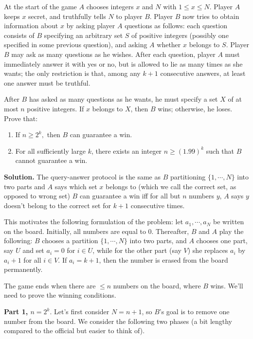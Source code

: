 \documentclass[11pt,a4paper]{article}
\begin{document}
\begin{enumerate}
		At the start of the game $A$ chooses integers $x$ and $N$ with $1 \le x \le N.$ Player $A$ keeps $x$ secret, and truthfully tells $N$ to player $B$. Player $B$ now tries to obtain information about $x$ by asking player $A$ questions as follows: each question consists of $B$ specifying an arbitrary set $S$ of positive integers (possibly one specified in some previous question), and asking $A$ whether $x$ belongs to $S$. Player $B$ may ask as many questions as he wishes. After each question, player $A$ must immediately answer it with yes or no, but is allowed to lie as many times as she wants; the only restriction is that, among any $k+1$ consecutive answers, at least one answer must be truthful.
		
		After $B$ has asked as many questions as he wants, he must specify a set $X$ of at most $n$ positive integers. If $x$ belongs to $X$, then $B$ wins; otherwise, he loses. Prove that:
		\begin{enumerate}
			\item 
			If $n \ge 2^k,$ then $B$ can guarantee a win.
			
			\item For all sufficiently large $k$, there exists an integer $n \ge (1.99)^k$ such that $B$ cannot guarantee a win.
		\end{enumerate}
		
		\textbf{Solution.} 
		The query-answer protocol is the same as $B$ partitioning $\{1, \cdots, N\}$ into two parts and $A$ says which set $x$ belongs to (which we call the correct set, as opposed to wrong set)
		$B$ can guarantee a win iff for all but $n$ numbers $y$, $A$ says $y$ doesn't belong to the correct set for $k+1$ consecutive times. 
		
		This motivates the following formulation of the problem: 
		let $a_1, \cdots, a_N$ be written on the board. 
		Initially, all numbers are equal to 0. 
		Thereafter, $B$ and $A$ play the following: 
		$B$ chooses a partition $\{1, \cdots, N\}$ into two parts, 
		and $A$ chooses one part, say $U$ and set $a_i=0$ for $i\in U$, 
		while for the other part (say $V$) she replaces $a_i$ by $a_i+1$ for all $i\in V$. 
		If $a_i=k+1$, then the number is erased from the board permanently. 
		
		The game ends when there are $\le n$ numbers on the board, where $B$ wins. 
		We'll need to prove the winning conditions. 
		
		\textbf{Part 1, $n=2^k$}. Let's first consider $N = n + 1$, so $B$'s goal is to remove one number from the board. 
		We consider the following two phases (a bit lengthy compared to the official but easier to think of). 
		

\end{enumerate}
\end{document}
